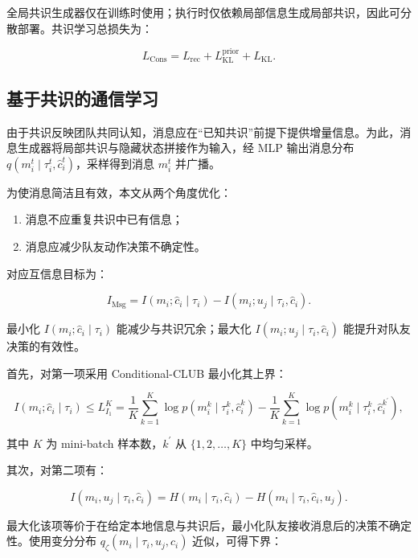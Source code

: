 全局共识生成器仅在训练时使用；执行时仅依赖局部信息生成局部共识，因此可分散部署。共识学习总损失为：

\begin{equation}
L_{\text{Cons}}=L_{\text{rec}}+L_{\text{KL}}^{\text{prior}}+L_{\text{KL}}.
\tag{6}
\end{equation}

\subsection*{基于共识的通信学习}

由于共识反映团队共同认知，消息应在“已知共识”前提下提供增量信息。为此，消息生成器将局部共识与隐藏状态拼接作为输入，经 MLP 输出消息分布 $q(m_i^t\mid \tau_i^t,\hat c_i^t)$，采样得到消息 $m_i^t$ 并广播。

为使消息简洁且有效，本文从两个角度优化：

\begin{enumerate}
    \item 消息不应重复共识中已有信息；
    \item 消息应减少队友动作决策不确定性。
\end{enumerate}

对应互信息目标为：

\begin{equation}
I_{\text{Msg}}
=
I(m_i;\hat c_i\mid \tau_i)-I(m_i;u_j\mid \tau_i,\hat c_i).
\tag{7}
\end{equation}

最小化 $I(m_i;\hat c_i\mid \tau_i)$ 能减少与共识冗余；最大化 $I(m_i;u_j\mid \tau_i,\hat c_i)$ 能提升对队友决策的有效性。

首先，对第一项采用 Conditional-CLUB 最小化其上界：

\begin{equation}
I(m_i;\hat c_i\mid \tau_i)\le L_{I_1}^{K}
=
\frac{1}{K}\sum_{k=1}^{K}\log p(m_i^{k}\mid \tau_i^{k},\hat c_i^{k})
-\frac{1}{K}\sum_{k=1}^{K}\log p(m_i^{k}\mid \tau_i^{k},\hat c_i^{k^{\prime}}),
\tag{8}
\end{equation}

其中 $K$ 为 mini-batch 样本数，$k^{\prime}$ 从 $\{1,2,\ldots,K\}$ 中均匀采样。

其次，对第二项有：

\begin{equation}
I(m_i,u_j\mid \tau_i,\hat c_i)
=
H(m_i\mid \tau_i,\hat c_i)-H(m_i\mid \tau_i,\hat c_i,u_j).
\tag{9}
\end{equation}

最大化该项等价于在给定本地信息与共识后，最小化队友接收消息后的决策不确定性。使用变分分布 $q_{\zeta}(m_i\mid \tau_i,u_j,\hat c_i)$ 近似，可得下界：

